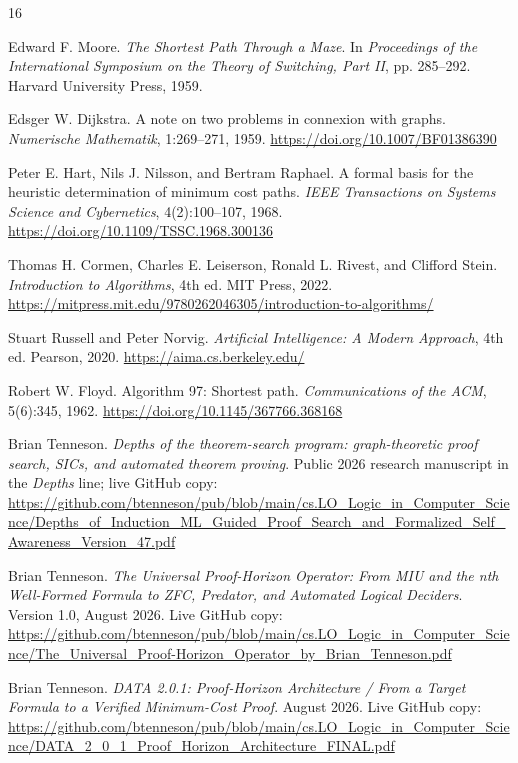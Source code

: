 \begin{thebibliography}{16}

Edward F. Moore.
\emph{The Shortest Path Through a Maze}.
In \emph{Proceedings of the International Symposium on the Theory of Switching, Part II}, pp. 285--292. Harvard University Press, 1959.

Edsger W. Dijkstra.
A note on two problems in connexion with graphs.
\emph{Numerische Mathematik}, 1:269--271, 1959.
\url{https://doi.org/10.1007/BF01386390}

Peter E. Hart, Nils J. Nilsson, and Bertram Raphael.
A formal basis for the heuristic determination of minimum cost paths.
\emph{IEEE Transactions on Systems Science and Cybernetics}, 4(2):100--107, 1968.
\url{https://doi.org/10.1109/TSSC.1968.300136}

Thomas H. Cormen, Charles E. Leiserson, Ronald L. Rivest, and Clifford Stein.
\emph{Introduction to Algorithms}, 4th ed.
MIT Press, 2022.
\url{https://mitpress.mit.edu/9780262046305/introduction-to-algorithms/}

Stuart Russell and Peter Norvig.
\emph{Artificial Intelligence: A Modern Approach}, 4th ed.
Pearson, 2020.
\url{https://aima.cs.berkeley.edu/}

Robert W. Floyd.
Algorithm 97: Shortest path.
\emph{Communications of the ACM}, 5(6):345, 1962.
\url{https://doi.org/10.1145/367766.368168}

Brian Tenneson.
\emph{Depths of the theorem-search program: graph-theoretic proof search, SICs, and automated theorem proving}.
Public 2026 research manuscript in the \emph{Depths} line; live GitHub copy:
\url{https://github.com/btenneson/pub/blob/main/cs.LO_Logic_in_Computer_Science/Depths_of_Induction_ML_Guided_Proof_Search_and_Formalized_Self_Awareness_Version_47.pdf}

Brian Tenneson.
\emph{The Universal Proof-Horizon Operator: From MIU and the nth Well-Formed Formula to ZFC, Predator, and Automated Logical Deciders}.
Version 1.0, August 2026. Live GitHub copy:
\url{https://github.com/btenneson/pub/blob/main/cs.LO_Logic_in_Computer_Science/The_Universal_Proof-Horizon_Operator_by_Brian_Tenneson.pdf}

Brian Tenneson.
\emph{DATA 2.0.1: Proof-Horizon Architecture / From a Target Formula to a Verified Minimum-Cost Proof}.
August 2026. Live GitHub copy:
\url{https://github.com/btenneson/pub/blob/main/cs.LO_Logic_in_Computer_Science/DATA_2_0_1_Proof_Horizon_Architecture_FINAL.pdf}


\end{thebibliography}

